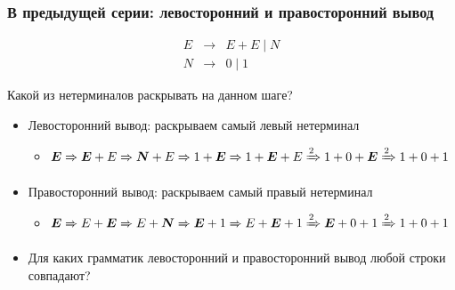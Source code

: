 \documentclass{beamer}
\newcommand{\derives}[1][*]{\xRightarrow[]{#1}}
\def\To{\derives[]}
\begin{document}
\begin{frame}[fragile]
  \transwipe[direction=90]
  \frametitle{В предыдущей серии: левосторонний и правосторонний вывод}

\[
  \begin{array}{rcl}
  E& \to & E + E \mid N \\
  N& \to & 0 \mid 1
  \end{array}
\]


\begin{center}
    Какой из нетерминалов раскрывать на данном шаге?
\end{center}

  \begin{itemize}
    \item Левосторонний вывод: раскрываем самый левый нетерминал
    \begin{itemize}
      \item $\boldsymbol{E} \To \boldsymbol{E} + E \To \boldsymbol{N} + E \To 1 + \boldsymbol{E} \To 1 + \boldsymbol{E} + E \derives[2] 1 + 0 + \boldsymbol{E} \derives[2] 1 + 0 + 1 $ \pause
	\end{itemize}
    \item Правосторонний вывод: раскрываем самый правый нетерминал
    \begin{itemize}
      \item $\boldsymbol{E} \To E + \boldsymbol{E} \To E + \boldsymbol{N} \To \boldsymbol{E} + 1 \To E + \boldsymbol{E} + 1 \derives[2] \boldsymbol{E} + 0 + 1 \derives[2] 1 + 0 + 1 $
	\end{itemize}
	\pause
	\item Для каких грамматик левосторонний и правосторонний вывод любой строки совпадают?
  \end{itemize}
\end{frame}
\end{document}
